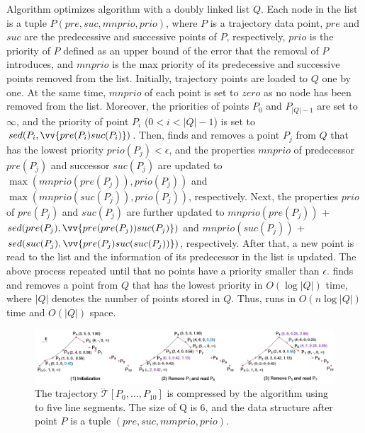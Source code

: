 Algorithm \squishe optimizes algorithm \tpa with a doubly linked list $Q$. Each node in the list is a tuple $P(pre, suc, mnprio, prio )$, where $P$ is a trajectory data point, $pre$ and $suc$ are the predecessive  and successive points of $P$, respectively,  $prio$ is the priority of $P$ defined as an upper bound of the \sed error that the removal of $P$ introduces, and $mnprio$ is the max priority of its predecessive and successive points removed from the list.
%
Initially, trajectory points are loaded to $Q$ one by one.
At the same time, $mnprio$ of each point is set to $zero$ as no node has been removed from the list.
Moreover, the priorities of points $P_0$ and $P_{|Q|-1}$ are set to $\infty$, and the priority of point $P_i$ ($0<i<|Q|-1$) is set to $sed(P_i, \vv{pre(P_{i})suc(P_{i})})$.
%
Then, \squishe finds and removes a point $P_j$ from $Q$ that has the lowest priority $prio(P_j)<\epsilon$, and the properties $mnprio$ of predecessor $pre(P_j)$ and successor $suc(P_j)$ are updated to $\max(mnprio(pre(P_j)), prio(P_j))$ and $\max(mnprio(suc(P_j)), prio(P_j))$, respectively.
Next, the properties $prio$ of $pre(P_j)$ and $suc(P_j)$ are further updated to $mnprio(pre(P_j))$ + $sed(pre(P_j), \vv{pre(pre(P_{j}))suc(P_{j})})$ and $mnprio(suc(P_j))$ + $sed(suc(P_j),\vv{pre(P_{j})suc(suc(P_{j}))})$, respectively.
%
After that, a new point is read to the list and the information of its predecessor in the list is updated.
%
The above process repeated until that no points have a priority smaller than $\epsilon$.
%
\squishe finds and removes a point from $Q$ that has the lowest priority in $O(\log |Q|)$ time, where $|Q|$ denotes the number of points stored in $Q$.
Thus, \squishe runs in $O(n\log |Q|)$ time and $O(|Q|)$ space.



\begin{figure}[tb!]
	\centering
	\includegraphics[scale=0.48]{Figures/Fig-Squishe.jpg}
	\vspace{-1ex}
	\caption{\small The trajectory $\dddot{\mathcal{T}}[P_0, \ldots, P_{10}]$ is compressed by the \squishe algorithm using \sed to five line segments. The size of Q is 6, and the data structure after point $P$ is a tuple $(pre, suc, mmprio, prio)$. }
	\vspace{-1ex}
	\label{fig:squishe}
\end{figure}



